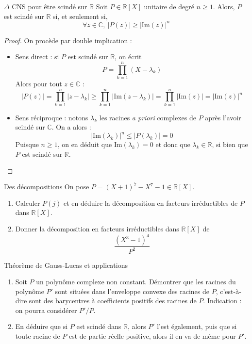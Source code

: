 \documentclass[french,a4paper]{article}
\newcommand{\R}{\mathbb{R}}
\newcommand{\C}{\mathbb{C}}
\newcommand{\im}{\text{Im}}
\theoremstyle{plain}
\theoremstyle{definition}
\theoremstyle{remark}
\begin{document}
\begin{ex}{$\Delta$ CNS pour être scindé sur $\R$}
	Soit $P\in\R[X]$ unitaire de degré $n\geqslant1$. Alors, $P$ est scindé sur $\R$ si, et seulement si, $$\forall z\in\C,\ \lvert P(z)\rvert\geqslant\lvert\im(z)\rvert^n$$
\end{ex}
\begin{proof}
	On procède par double implication :
	\begin{itemize}
		\item Sens direct : si $P$ est scindé sur $\R$, on écrit $$P=\prod_{k=1}^{n}(X-\lambda_k)$$ Alors pour tout $z\in\C$ : $$\lvert P(z)\rvert=\prod_{k=1}^{n}\lvert z-\lambda_k\rvert \geqslant \prod_{k=1}^{n}\lvert\im(z-\lambda_k)\rvert=\prod_{k=1}^{n}\lvert\im(z)\rvert=\lvert\im(z)\rvert ^n$$
		\item Sens réciproque : notons $\lambda_k$ les racines \textit{a priori} complexes de $P$ après l'avoir scindé sur $\C$. On a alors : $$\lvert\im(\lambda_k)\rvert^n\leqslant\lvert P(\lambda_k)\rvert=0$$ Puisque $n\geqslant1$, on en déduit que $\im(\lambda_k)=0$ et donc que $\lambda_k\in\R$, si bien que $P$ est scindé sur $\R$.
	\end{itemize}
\end{proof}

\begin{ex}{Des décompositions}
	On pose $P=(X+1)^7-X^7-1\in\R[X]$.
	\begin{enumerate}
		\item Calculer $P(j)$ et en déduire la décomposition en facteurs irréductibles de $P$ dans $\R[X]$.
		\item Donner la décomposition en facteurs irréductibles dans $\R[X]$ de $$\frac{(X^3-1)^4}{P^2}$$
	\end{enumerate}
\end{ex}

\begin{ex}[Châteaux]{Théorème de Gauss-Lucas et applications}
	\begin{enumerate}
		\item Soit $P$ un polynôme complexe non constant. Démontrer que les racines du polynôme $P'$ sont situées dans l'enveloppe convexe des racines de $P$, c'est-à-dire sont des barycentres à coefficients positifs des racines de $P$. Indication : on pourra considérer $P'/P$.
		\item En déduire que si $P$ est scindé dans $\R$, alors $P'$ l'est également, puis que si toute racine de $P$ est de partie réelle positive, alors il en va de même pour $P'$.
	\end{enumerate}
\end{ex}
\end{document}
